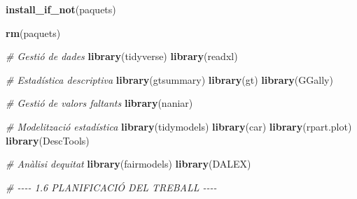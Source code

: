 \documentclass[CAT]{TFUOC}%
\newenvironment{Shaded}{\begin{snugshade}}{\end{snugshade}}
\newcommand{\CommentTok}[1]{\textcolor[rgb]{0.56,0.35,0.01}{\textit{#1}}}
\newcommand{\FunctionTok}[1]{\textcolor[rgb]{0.13,0.29,0.53}{\textbf{#1}}}
\newcommand{\NormalTok}[1]{#1}
\begin{document}
\begin{Shaded}
\begin{Highlighting}[]
\FunctionTok{install\_if\_not}\NormalTok{(paquets)}

\FunctionTok{rm}\NormalTok{(paquets)}

\CommentTok{\# Gestió de dades}
\FunctionTok{library}\NormalTok{(tidyverse)}
\FunctionTok{library}\NormalTok{(readxl)}

\CommentTok{\# Estadística descriptiva}
\FunctionTok{library}\NormalTok{(gtsummary)}
\FunctionTok{library}\NormalTok{(gt)}
\FunctionTok{library}\NormalTok{(GGally)}

\CommentTok{\# Gestió de valors faltants}
\FunctionTok{library}\NormalTok{(naniar)}

\CommentTok{\# Modelització estadística}
\FunctionTok{library}\NormalTok{(tidymodels)}
\FunctionTok{library}\NormalTok{(car)}
\FunctionTok{library}\NormalTok{(rpart.plot)}
\FunctionTok{library}\NormalTok{(DescTools)}

\CommentTok{\# Anàlisi d\textquotesingle{}equitat}
\FunctionTok{library}\NormalTok{(fairmodels)}
\FunctionTok{library}\NormalTok{(DALEX)}


\CommentTok{\# {-}{-}{-}{-} 1.6 PLANIFICACIÓ DEL TREBALL {-}{-}{-}{-}}


\end{Highlighting}
\end{Shaded}
\end{document}
